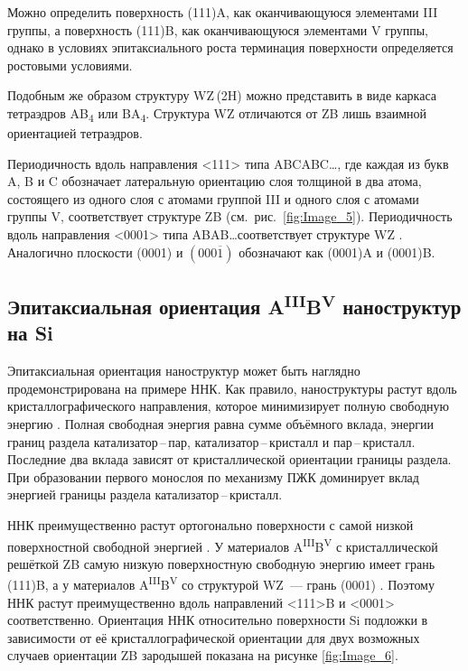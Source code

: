 Можно определить поверхность (111)A, как оканчивающуюся элементами III группы,
а поверхность (111)B, как оканчивающуюся элементами V группы, однако в условиях
эпитаксиального роста терминация поверхности определяется ростовыми условиями.

Подобным же образом структуру WZ\,(2H) можно представить в виде каркаса
тетраэдров AB\textsubscript{4} или BA\textsubscript{4}. Структура WZ отличаются
от ZB лишь взаимной ориентацией тетраэдров.

Периодичность вдоль направления <111> типа ABCABC\dots, где каждая из букв A, B
и C обозначает латеральную ориентацию слоя толщиной в два атома, состоящего из
одного слоя с атомами группой III и одного слоя с атомами группы V,
соответствует структуре ZB (см.~рис.~\cref{fig:Image_5}). Периодичность вдоль
направления <0001> типа ABAB\dots соответствует структуре WZ
\cite{Kriegner2011}. Аналогично плоскости (0001) и \((000\overline{1})\)
обозначают как (0001)A и (0001)B.

\subsection{Эпитаксиальная ориентация
A\textsuperscript{III}B\textsuperscript{V} наноструктур на
Si}\label{subsec:ch1/sec2/sub4}

Эпитаксиальная ориентация наноструктур может быть наглядно продемонстрирована
на примере ННК. Как правило, наноструктуры растут вдоль кристаллографического
направления, которое минимизирует полную свободную энергию \cite{Wagner1964}.
Полная свободная энергия равна сумме объёмного вклада, энергии границ раздела
катализатор\,--\,пар, катализатор\,--\,кристалл и пар\,--\,кристалл. Последние
два вклада зависят от кристаллической ориентации границы раздела. При
образовании первого монослоя по механизму ПЖК доминирует вклад энергией границы
раздела катализатор\,--\,кристалл.

ННК преимущественно растут ортогонально поверхности с самой низкой
поверхностной свободной энергией \cite{Wagner1964}. У материалов
A\textsuperscript{III}B\textsuperscript{V} с кристаллической решёткой ZB самую
низкую поверхностную свободную энергию имеет грань (111)B, а у материалов
A\textsuperscript{III}B\textsuperscript{V} со структурой WZ~--- грань (0001)
\cite{Fortuna2010}. Поэтому ННК растут преимущественно вдоль направлений <111>B
и <0001> соответственно. Ориентация ННК относительно поверхности Si подложки в
зависимости от её кристаллографической ориентации для двух возможных случаев
ориентации ZB зародышей показана на рисунке \cref{fig:Image_6}.

